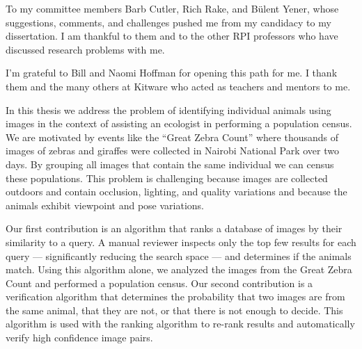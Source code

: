 \documentclass[chap]{thesis}
\begin{document}
To my committee members Barb Cutler, Rich Rake, and Bülent Yener, whose suggestions, comments, and challenges
  pushed me from my candidacy to my dissertation.
I am thankful to them and to the other RPI professors who have discussed research problems with me.

I'm grateful to Bill and Naomi Hoffman for opening this path for me.
I thank them and the many others at Kitware who acted as teachers and mentors to me.





\begin{comment}

Dana

Zach Jablons
Jason, Hendrik Weideman 

Chuck, Barb, Rich, and Bulent

Bill and Naomi Hoffman

Wes Turner, Rusty Blue,
Amitha Perea, 
Roddy Collins, Arslan Basharat, Matt Turek


Too many people at kitware to thank
Bob O'Bara and David Cole

\end{comment}


In this thesis we address the problem of identifying individual animals using images in the context of assisting
  an ecologist in performing a population census.
We are motivated by events like the ``Great Zebra Count'' where thousands of images of zebras and giraffes were
  collected in Nairobi National Park over two days.
By grouping all images that contain the same individual we can census these populations.
This problem is challenging because images are collected outdoors and contain occlusion, lighting, and quality
  variations and because the animals exhibit viewpoint and pose variations.

Our first contribution is an algorithm that ranks a database of images by their similarity to a query.
A manual reviewer inspects only the top few results for each query --- significantly reducing the search space
  --- and determines if the animals match.
Using this algorithm alone, we analyzed the images from the Great Zebra Count and performed a population census.
Our second contribution is a verification algorithm that determines the probability that two images are from the
  same animal, that they are not, or that there is not enough to decide.
This algorithm is used with the ranking algorithm to re-rank results and automatically verify high confidence
  image pairs.
\end{document}
